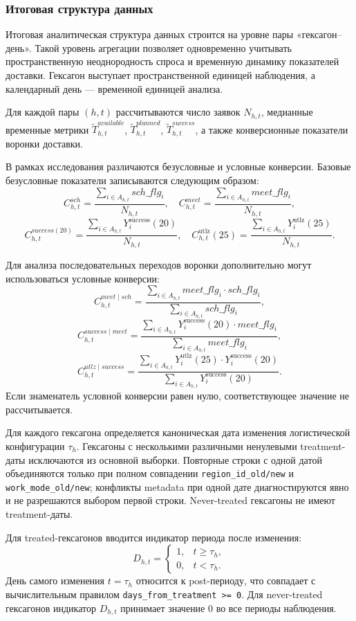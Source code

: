 \documentclass[14pt,a4paper]{extarticle}
\begin{document}
\subsubsection{Итоговая структура данных}

Итоговая аналитическая структура данных строится на уровне пары «гексагон--день». Такой уровень агрегации позволяет одновременно учитывать пространственную неоднородность спроса и временную динамику показателей доставки. Гексагон выступает пространственной единицей наблюдения, а календарный день --- временной единицей анализа.

Для каждой пары \((h,t)\) рассчитываются число заявок \(N_{h,t}\), медианные временные метрики \(\widetilde{T}^{available}_{h,t}\), \(\widetilde{T}^{planned}_{h,t}\), \(\widetilde{T}^{success}_{h,t}\), а также конверсионные показатели воронки доставки.

В рамках исследования различаются безусловные и условные конверсии. Базовые безусловные показатели записываются следующим образом:
\[
C^{sch}_{h,t}=\frac{\sum_{i \in A_{h,t}} sch\_flg_i}{N_{h,t}},
\quad
C^{meet}_{h,t}=\frac{\sum_{i \in A_{h,t}} meet\_flg_i}{N_{h,t}},
\]
\[
C^{success(20)}_{h,t}=\frac{\sum_{i \in A_{h,t}} Y_i^{\mathrm{success}}(20)}{N_{h,t}},
\quad
C^{\mathrm{utlz}}_{h,t}(25)=\frac{\sum_{i \in A_{h,t}} Y_i^{\mathrm{utlz}}(25)}{N_{h,t}}.
\]

Для анализа последовательных переходов воронки дополнительно могут использоваться условные конверсии:
\[
C^{meet\mid sch}_{h,t}=
\frac{\sum_{i \in A_{h,t}} meet\_flg_i \cdot sch\_flg_i}
{\sum_{i \in A_{h,t}} sch\_flg_i},
\]
\[
C^{success\mid meet}_{h,t}=
\frac{\sum_{i \in A_{h,t}} Y_i^{\mathrm{success}}(20) \cdot meet\_flg_i}
{\sum_{i \in A_{h,t}} meet\_flg_i},
\]
\[
C^{utlz\mid success}_{h,t}=
\frac{\sum_{i \in A_{h,t}} Y_i^{\mathrm{utlz}}(25) \cdot Y_i^{\mathrm{success}}(20)}
{\sum_{i \in A_{h,t}} Y_i^{\mathrm{success}}(20)}.
\]
Если знаменатель условной конверсии равен нулю, соответствующее значение не рассчитывается.

Для каждого гексагона определяется каноническая дата изменения логистической конфигурации \(\tau_h\). Гексагоны с несколькими различными ненулевыми treatment-даты исключаются из основной выборки. Повторные строки с одной датой объединяются только при полном совпадении \texttt{region\_id\_old/new} и \texttt{work\_mode\_old/new}; конфликты metadata при одной дате диагностируются явно и не разрешаются выбором первой строки. Never-treated гексагоны не имеют treatment-даты.

Для treated-гексагонов вводится индикатор периода после изменения:
\[
D_{h,t} =
\begin{cases}
1, & t \geq \tau_h, \\
0, & t < \tau_h.
\end{cases}
\]
День самого изменения \(t=\tau_h\) относится к post-периоду, что совпадает с вычислительным правилом \texttt{days\_from\_treatment >= 0}. Для never-treated гексагонов индикатор \(D_{h,t}\) принимает значение 0 во все периоды наблюдения.
\end{document}
